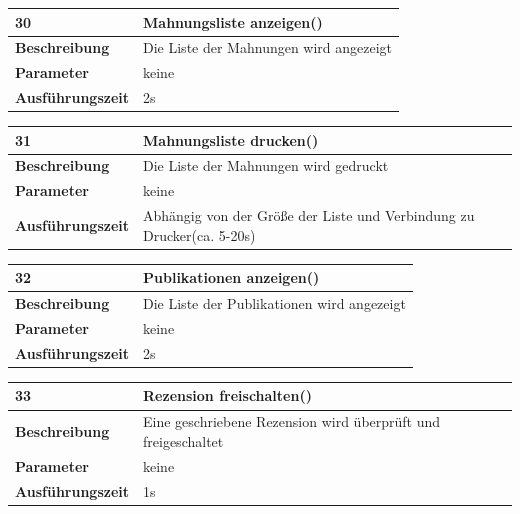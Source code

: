 \documentclass[fontsize=12pt,paper=a4,twoside]{scrartcl}
\begin{document}
  \begin{table}[htbp]
  \label{a30}
  \begin{tabular}{|l|p{10cm}|}
  \hline 
  \textbf{30} & \textbf{Mahnungsliste anzeigen()} \\ \hline
  \textbf{Beschreibung} & Die Liste der Mahnungen wird angezeigt\\ \hline
  \textbf{Parameter} & keine \\ \hline
  \textbf{Ausführungszeit} & 2s\\ \hline
  \end{tabular}
  \end{table}

  \begin{table}[htbp]
  \label{a31}
  \begin{tabular}{|l|p{10cm}|}
  \hline 
  \textbf{31} & \textbf{Mahnungsliste drucken()} \\ \hline
  \textbf{Beschreibung} & Die Liste der Mahnungen wird gedruckt\\ \hline
  \textbf{Parameter} & keine \\ \hline
  \textbf{Ausführungszeit} & Abhängig von der Größe der Liste und Verbindung zu Drucker(ca. 5-20s)\\ \hline
  \end{tabular}
  \end{table}

  \begin{table}[htbp]
  \label{a32}
  \begin{tabular}{|l|p{10cm}|}
  \hline 
  \textbf{32} & \textbf{Publikationen anzeigen()} \\ \hline
  \textbf{Beschreibung} & Die Liste der Publikationen wird angezeigt\\ \hline
  \textbf{Parameter} & keine \\ \hline
  \textbf{Ausführungszeit} & 2s\\ \hline
  \end{tabular}
  \end{table}

  \begin{table}[htbp]
  \label{a33}
  \begin{tabular}{|l|p{10cm}|}
  \hline 
  \textbf{33} & \textbf{Rezension freischalten()} \\ \hline
  \textbf{Beschreibung} & Eine geschriebene Rezension wird überprüft und freigeschaltet\\ \hline
  \textbf{Parameter} & keine \\ \hline
  \textbf{Ausführungszeit} & 1s\\ \hline
  \end{tabular}
  \end{table}
\end{document}
